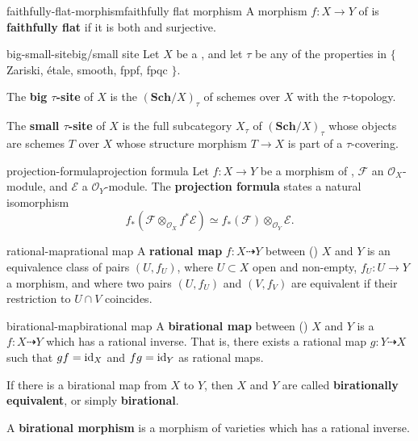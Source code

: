 \begin{topic}{faithfully-flat-morphism}{faithfully flat morphism}
    A morphism $f : X \to Y$ of  is \textbf{faithfully flat} if it is both  and surjective.
\end{topic}

\begin{topic}{big-small-site}{big/small site}
    Let $X$ be a , and let $\tau$ be any of the properties in $\{$ Zariski, étale, smooth, fppf, fpqc $\}$.
    
    The \textbf{big $\tau$-site} of $X$ is the  $(\textbf{Sch}/X)_\tau$ of schemes over $X$ with the $\tau$-topology.
    
    The \textbf{small $\tau$-site} of $X$ is the full subcategory $X_\tau$ of $(\textbf{Sch}/X)_\tau$ whose objects are schemes $T$ over $X$ whose structure morphism $T \to X$ is part of a $\tau$-covering.
\end{topic}

\begin{topic}{projection-formula}{projection formula}
    Let $f : X \to Y$ be a morphism of , $\mathcal{F}$ an $\mathcal{O}_X$-module, and $\mathcal{E}$ a  $\mathcal{O}_Y$-module. The \textbf{projection formula} states a natural isomorphism
    \[ f_*\left(\mathcal{F} \otimes_{\mathcal{O}_X} f^* \mathcal{E} \right) \simeq f_*\left(\mathcal{F}\right) \otimes_{\mathcal{O}_Y} \mathcal{E} . \]
\end{topic}

\begin{topic}{rational-map}{rational map}
    A \textbf{rational map} $f : X \dashrightarrow Y$ between ()  $X$ and $Y$ is an equivalence class of pairs $(U, f_U)$, where $U \subset X$ open and non-empty, $f_U : U \to Y$ a morphism, and where two pairs $(U, f_U)$ and $(V, f_V)$ are equivalent if their restriction to $U \cap V$ coincides.
\end{topic}

\begin{topic}{birational-map}{birational map}
    A \textbf{birational map} between ()  $X$ and $Y$ is a  $f : X \dashrightarrow Y$ which has a rational inverse. That is, there exists a rational map $g : Y \dashrightarrow X$ such that $gf = \text{id}_X$ and $fg = \text{id}_Y$ as rational maps.
    
    If there is a birational map from $X$ to $Y$, then $X$ and $Y$ are called \textbf{birationally equivalent}, or simply \textbf{birational}.
    
    A \textbf{birational morphism} is a morphism of varieties which has a rational inverse.
\end{topic}

